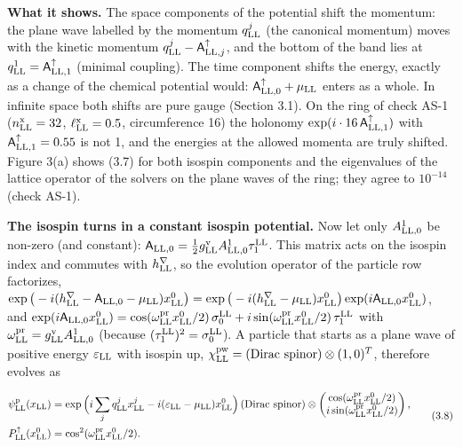 \documentclass[
  10pt,
]{article}
\begin{document}
\textbf{What it shows.} The space components of the potential shift the
momentum: the plane wave labelled by the momentum \(q^j_{\rm LL}\) (the
canonical momentum) moves with the kinetic momentum
\(q^j_{\rm LL}-\mathsf A^\uparrow_{{\rm LL},j}\), and the bottom of the
band lies at \(q^1_{\rm LL}=\mathsf A^\uparrow_{{\rm LL},1}\) (minimal
coupling). The time component shifts the energy, exactly as a change of
the chemical potential would:
\(\mathsf A^\uparrow_{{\rm LL},0}+\mu_{\rm LL}\) enters as a whole. In
infinite space both shifts are pure gauge (Section 3.1). On the ring of
check AS-1 (\(n^{\rm x}_{\rm LL}=32\), \(\ell^{\rm x}_{\rm LL}=0.5\),
circumference 16) the holonomy
\(\exp(i\cdot16\,\mathsf A^\uparrow_{{\rm LL},1})\) with
\(\mathsf A^\uparrow_{{\rm LL},1}=0.55\) is not 1, and the energies at
the allowed momenta are truly shifted. Figure 3(a) shows (3.7) for both
isospin components and the eigenvalues of the lattice operator of the
solvers on the plane waves of the ring; they agree to \(10^{-14}\)
(check AS-1).

\textbf{The isospin turns in a constant isospin potential.} Now let only
\(A^1_{{\rm LL},0}\) be non-zero (and constant):
\(\mathsf A_{{\rm LL},0}=\tfrac12g^{\rm v}_{\rm LL}A^1_{{\rm LL},0}\tau^{\rm LL}_1\).
This matrix acts on the isospin index and commutes with
\(h^\nabla_{\rm LL}\), so the evolution operator of the particle row
factorizes,
\(\exp\big(-i(h^\nabla_{\rm LL}-\mathsf A_{{\rm LL},0}-\mu_{\rm LL})x^0_{\rm LL}\big)=\exp\big(-i(h^\nabla_{\rm LL}-\mu_{\rm LL})x^0_{\rm LL}\big)\exp(i\mathsf A_{{\rm LL},0}x^0_{\rm LL})\),
and
\(\exp(i\mathsf A_{{\rm LL},0}x^0_{\rm LL})=\cos(\omega^{\rm pr}_{\rm LL}x^0_{\rm LL}/2)\,\sigma^{\rm LL}_0+i\sin(\omega^{\rm pr}_{\rm LL}x^0_{\rm LL}/2)\,\tau^{\rm LL}_1\)
with \(\omega^{\rm pr}_{\rm LL}=g^{\rm v}_{\rm LL}A^1_{{\rm LL},0}\)
(because \((\tau^{\rm LL}_1)^2=\sigma^{\rm LL}_0\)). A particle that
starts as a plane wave of positive energy \(\varepsilon_{\rm LL}\) with
isospin up,
\(\chi^{\rm pw}_{\rm LL}=(\text{Dirac spinor})\otimes(1,0)^T\),
therefore evolves as

\[\begin{aligned}\psi^{\rm p}_{\rm LL}(x_{\rm LL})&=\exp\Big(i\sum_jq^j_{\rm LL}x^j_{\rm LL}-i(\varepsilon_{\rm LL}-\mu_{\rm LL})x^0_{\rm LL}\Big)\,(\text{Dirac spinor})\otimes\begin{pmatrix}\cos(\omega^{\rm pr}_{\rm LL}x^0_{\rm LL}/2)\\i\sin(\omega^{\rm pr}_{\rm LL}x^0_{\rm LL}/2)\end{pmatrix},\\P^\uparrow_{\rm LL}(x^0_{\rm LL})&=\cos^2(\omega^{\rm pr}_{\rm LL}x^0_{\rm LL}/2).\end{aligned}\tag{3.8}\]
\end{document}
